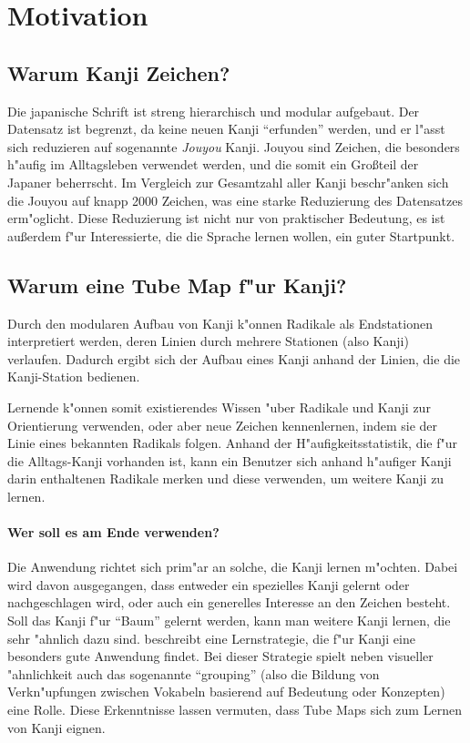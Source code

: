 \section{Motivation}
\subsection{Warum Kanji Zeichen?}
Die japanische Schrift ist streng hierarchisch und modular aufgebaut. Der Datensatz ist begrenzt, da keine neuen Kanji "`erfunden"' werden, und er l"asst sich reduzieren auf sogenannte \emph{Jouyou} Kanji. Jouyou sind Zeichen, die besonders h"aufig im Alltagsleben verwendet werden, und die somit ein Gro\ss teil der Japaner beherrscht. Im Vergleich zur Gesamtzahl aller Kanji beschr"anken sich die Jouyou auf knapp 2000 Zeichen, was eine starke Reduzierung des Datensatzes erm"oglicht.
Diese Reduzierung ist nicht nur von praktischer Bedeutung, es ist au\ss erdem f"ur Interessierte, die die Sprache lernen wollen, ein guter Startpunkt. 

\subsection{Warum eine Tube Map f"ur Kanji?}
Durch den modularen Aufbau von Kanji k"onnen Radikale als Endstationen interpretiert werden, deren Linien durch mehrere Stationen (also Kanji) verlaufen. Dadurch ergibt sich der Aufbau eines Kanji anhand der Linien, die die Kanji-Station bedienen. 

Lernende k"onnen somit existierendes Wissen "uber Radikale und Kanji zur Orientierung verwenden, oder aber neue Zeichen kennenlernen, indem sie der Linie eines bekannten Radikals folgen. Anhand der H"aufigkeitsstatistik, die f"ur die Alltags-Kanji vorhanden ist, kann ein Benutzer sich anhand h"aufiger Kanji darin enthaltenen Radikale merken und diese verwenden, um weitere Kanji zu lernen. 
\paragraph{Wer soll es am Ende verwenden?}
Die Anwendung richtet sich prim"ar an solche, die Kanji lernen m"ochten. Dabei wird davon ausgegangen, dass entweder ein spezielles Kanji gelernt oder nachgeschlagen wird, oder auch ein generelles Interesse an den Zeichen besteht. Soll das Kanji f"ur "`Baum"' gelernt werden, kann man weitere Kanji lernen, die sehr "ahnlich dazu sind.  
\cite{kanjilearningjapanese10} beschreibt eine Lernstrategie, die f"ur Kanji eine besonders gute Anwendung findet. Bei dieser Strategie spielt neben visueller "ahnlichkeit auch das sogenannte "`grouping"' (also die Bildung von Verkn"upfungen zwischen Vokabeln basierend auf Bedeutung oder Konzepten) eine Rolle. Diese Erkenntnisse lassen vermuten, dass Tube Maps sich zum Lernen von Kanji eignen.
